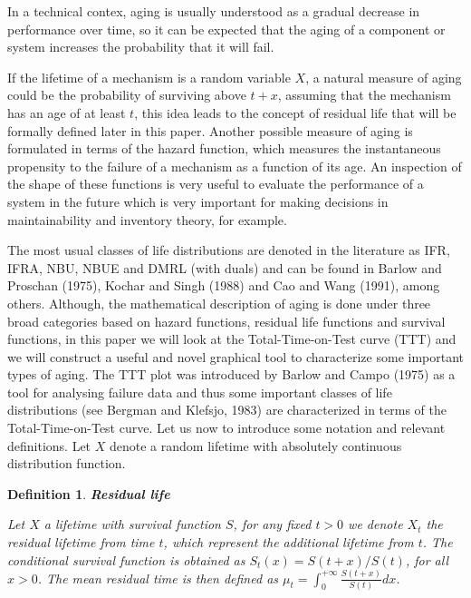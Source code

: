 \documentclass[preprint,12pt]{elsarticle}
\newtheorem{dfn}{{\sc Definition}}[section]
\begin{document}
In a technical contex, aging is usually understood as a gradual decrease in performance over time, so it can be expected that the aging of a component or system increases the probability that it will fail. 

If the lifetime of a mechanism is a random variable $ X $, a natural measure of aging could be the probability of surviving above $ t + x $, assuming that the mechanism has an age of at least $ t $, this idea leads to the concept of residual life that will be formally defined later in this paper.
Another possible measure of aging is formulated in terms of the hazard function, which measures the  instantaneous propensity to the failure of a mechanism as a function of  its age. An inspection of the shape of these functions is very useful to evaluate the performance of a system in the future which is very important for making decisions in maintainability and inventory theory, for example. 

 The most usual classes of life distributions are denoted in the literature as IFR, IFRA, NBU, NBUE and DMRL  (with duals) and can be found in Barlow and Proschan (1975), Kochar and Singh (1988) and Cao and Wang (1991), among others.
 Although, the mathematical description of aging is done under three broad categories based on hazard functions, residual life functions and survival functions, in this paper we will look at the Total-Time-on-Test curve (TTT) and we will construct a useful and novel graphical tool to characterize some important types of aging.  The TTT plot was introduced by Barlow and Campo (1975) as a tool for analysing failure data and thus some important classes of life distributions (see Bergman and Klefsjo, 1983) are characterized in terms of the Total-Time-on-Test curve. Let us now to introduce some notation and relevant definitions. Let $X$ denote a random lifetime with absolutely continuous distribution function. 

\begin{dfn} {\bf Residual life}

\noindent Let $X$ a lifetime with survival function $S$, for any fixed $t>0$ we denote $X_t$ the residual lifetime from time $t$, which represent the additional lifetime from $t$. The conditional survival function is obtained as $S_t(x)=S(t+x)/S(t)$, for all $x >0$. The mean residual time is then defined as $\mu_t= \int_0^{+\infty} \frac{S(t+x)}{S(t)}dx$.
\end{dfn}
\end{document}
